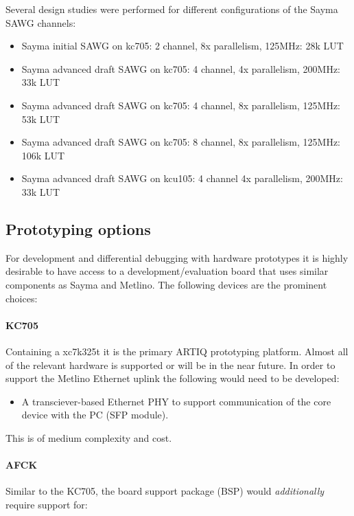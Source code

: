 \documentclass[11pt]{paper}
\begin{document}
Several design studies were performed for different configurations of the Sayma SAWG channels:

\begin{itemize}
    \item Sayma initial SAWG on kc705: 2 channel, 8x parallelism, 125MHz: 28k LUT
    \item Sayma advanced draft SAWG on kc705: 4 channel, 4x parallelism, 200MHz: 33k LUT
    \item Sayma advanced draft SAWG on kc705: 4 channel, 8x parallelism, 125MHz: 53k LUT
    \item Sayma advanced draft SAWG on kc705: 8 channel, 8x parallelism, 125MHz: 106k LUT
    \item Sayma advanced draft SAWG on kcu105: 4 channel 4x parallelism, 200MHz: 33k LUT
\end{itemize}

\subsection{Prototyping options}

For development and differential debugging with hardware prototypes it is highly desirable to have access to a development/evaluation board that uses similar components as Sayma and Metlino.
The following devices are the prominent choices:

\paragraph{KC705}

Containing a xc7k325t it is the primary ARTIQ prototyping platform.
Almost all of the relevant hardware is supported or will be in the near future.
In order to support the Metlino Ethernet uplink the following would need to be developed:

\begin{itemize}
   \item A transciever-based Ethernet PHY to support communication of the core
      device with the PC (SFP module).
\end{itemize}

This is of medium complexity and cost.

\paragraph{AFCK}

Similar to the KC705, the board support package (BSP) would \emph{additionally} require support for:
\end{document}
